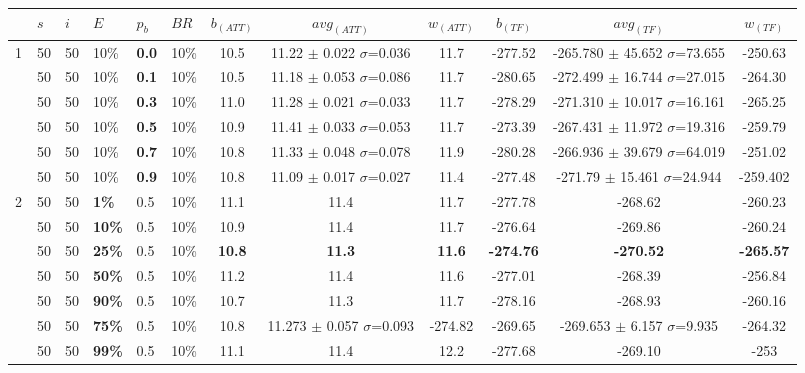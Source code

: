     \begin{sidewaystable}
    \hspace*{-0.5cm}
    \begin{tabular}{|l|l|l|l|l|l||c|c|c|c|c|c|}
    \hline
    ~ & $s$ & $i$ & $E$ & $p_{b}$ & $BR$ & $b_{(ATT)}$ & $avg_{(ATT)}$ & $w_{(ATT)}$ & $b_{(TF)}$ & $avg_{(TF)}$ & $w_{(TF)}$ \\
    \hline
    1 & 50 & 50 & 10\% & \textbf{0.0} & 10\% & 10.5 & 11.22 $\pm$ 0.022 $\sigma$=0.036 & 11.7 & -277.52 & -265.780 $\pm$ 45.652 $\sigma$=73.655 & -250.63 \\
    ~ & 50 & 50 & 10\% & \textbf{0.1} & 10\% & 10.5 & 11.18 $\pm$ 0.053 $\sigma$=0.086 & 11.7 & -280.65 & -272.499 $\pm$ 16.744 $\sigma$=27.015 & -264.30 \\
    ~ & 50 & 50 & 10\% & \textbf{0.3} & 10\% & 11.0 & 11.28 $\pm$ 0.021 $\sigma$=0.033 & 11.7 & -278.29 & -271.310 $\pm$ 10.017 $\sigma$=16.161 & -265.25 \\
    ~ & 50 & 50 & 10\% & \textbf{0.5} & 10\% & 10.9 & 11.41 $\pm$ 0.033 $\sigma$=0.053 & 11.7 & -273.39 & -267.431 $\pm$ 11.972 $\sigma$=19.316 & -259.79\\
    ~ & 50 & 50 & 10\% & \textbf{0.7} & 10\% & 10.8 & 11.33 $\pm$ 0.048 $\sigma$=0.078 & 11.9 & -280.28 & -266.936 $\pm$ 39.679 $\sigma$=64.019 & -251.02\\
    ~ & 50 & 50 & 10\% & \textbf{0.9} & 10\% & 10.8 & 11.09 $\pm$ 0.017 $\sigma$=0.027 & 11.4 & -277.48 & -271.79 $\pm$ 15.461 $\sigma$=24.944 & -259.402 \\
    \hline
    2 & 50 & 50 & \textbf{1\%} & 0.5 & 10\% & 11.1 & 11.4 & 11.7 & -277.78 & -268.62 & -260.23 \\
    ~ & 50 & 50 & \textbf{10\%} & 0.5 & 10\% & 10.9 & 11.4 & 11.7 & -276.64 & -269.86 & -260.24 \\
    ~ & 50 & 50 & \textbf{25\%} & 0.5 & 10\% &  \textbf{10.8} & \textbf{11.3} & \textbf{11.6} & \textbf{-274.76} & \textbf{-270.52} & \textbf{-265.57} \\
    ~ & 50 & 50 & \textbf{50\%} & 0.5 & 10\% &  11.2 & 11.4 & 11.6 & -277.01 & -268.39 & -256.84 \\
    ~ & 50 & 50 & \textbf{90\%} & 0.5 & 10\% & 10.7 & 11.3 & 11.7 & -278.16 & -268.93 & -260.16 \\
    ~ & 50 & 50 & \textbf{75\%} & 0.5 & 10\% & 10.8 & 11.273 $\pm$ 0.057 $\sigma$=0.093 & -274.82 & -269.65 & -269.653 $\pm$ 6.157 $\sigma$=9.935 & -264.32 \\
    ~ & 50 & 50 & \textbf{99\%} & 0.5 & 10\% & 11.1 & 11.4 & 12.2 & -277.68 & -269.10 & -253 \\

\end{tabular}
\end{sidewaystable}
